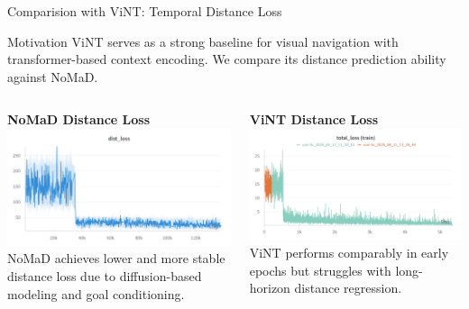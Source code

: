 \documentclass{beamer}
\begin{document}
\begin{frame}{Comparision with ViNT: Temporal Distance Loss}
        \begin{block}{Motivation}
            ViNT serves as a strong baseline for visual navigation with transformer-based context encoding. We compare its distance prediction ability against NoMaD.
        \end{block}
    
        \begin{columns}
            \begin{column}{0.48\textwidth}
                \begin{block}{\centering \small \textbf{NoMaD Distance Loss}}
                    \centering
                    \includegraphics[width=\textwidth]{images/dist_loss.png}
                    \tiny NoMaD achieves lower and more stable distance loss due to diffusion-based modeling and goal conditioning.
                \end{block}
            \end{column}
    
            \begin{column}{0.48\textwidth}
                \begin{block}{\centering \small \textbf{ViNT Distance Loss}}
                    \centering
                    \includegraphics[width=\textwidth]{images/distloss_vint.png}
                    \tiny ViNT performs comparably in early epochs but struggles with long-horizon distance regression.
                \end{block}
            \end{column}
        \end{columns}
    

\end{frame}
\end{document}

